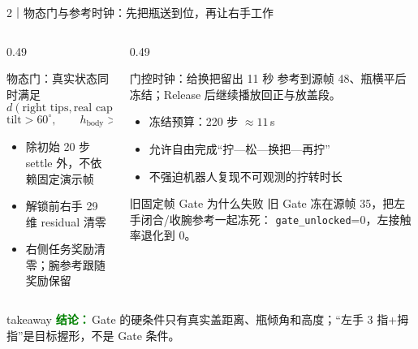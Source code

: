 \documentclass[aspectratio=169,10pt]{ctexbeamer}
\newcommand{\takeaway}[1]{%
  \begin{beamercolorbox}[wd=\textwidth,rounded=true,sep=0.55ex]{takeaway}
    \footnotesize\textcolor{Green}{\bfseries 结论：}\,#1
  \end{beamercolorbox}}
\begin{document}
\begin{frame}[t]{2｜物态门与参考时钟：先把瓶送到位，再让右手工作}
  \begin{columns}[T,onlytextwidth]
    \begin{column}{0.49\textwidth}
      \begin{block}{物态门：真实状态同时满足}
        \[
          d(\text{right tips},\text{real cap})<8\text{ cm}
        \]
        \[
          \mathrm{tilt}>60^\circ,\qquad h_{\mathrm{body}}>5\text{ cm}
        \]
        \begin{itemize}
          \item 除初始 20 步 settle 外，不依赖固定演示帧
          \item 解锁前右手 29 维 residual 清零
          \item 右侧任务奖励清零；腕参考跟随奖励保留
        \end{itemize}
      \end{block}
    \end{column}

    \begin{column}{0.49\textwidth}
      \begin{block}{门控时钟：给换把留出 11 秒}
        参考到源帧 48、瓶横平后冻结；Release 后继续播放回正与放盖段。
        \begin{itemize}
          \item 冻结预算：220 步 $\approx 11$\,s
          \item 允许自由完成“拧—松—换把—再拧”
          \item 不强迫机器人复现不可观测的拧转时长
        \end{itemize}
      \end{block}

      \begin{alertblock}{旧固定帧 Gate 为什么失败}
        旧 Gate 冻在源帧 35，把左手闭合/收腕参考一起冻死：
        \texttt{gate\_unlocked}=0，左接触率退化到 0。
      \end{alertblock}
    \end{column}
  \end{columns}

  \takeaway{Gate 的硬条件只有真实盖距离、瓶倾角和高度；“左手 3 指+拇指”是目标握形，不是 Gate 条件。}
\end{frame}
\end{document}
